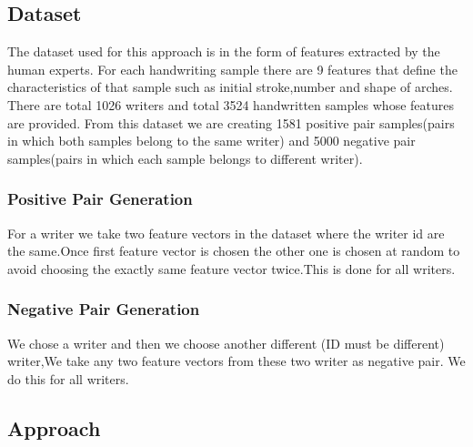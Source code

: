 \documentclass{article}
\begin{document}
\subsection{Dataset}
    The dataset used for this approach is in the form of features extracted by the human experts. For each handwriting sample there are 9 features that define the characteristics of that sample such as initial stroke,number and shape of arches. There are total 1026 writers and total 3524 handwritten samples whose features are provided. 
    From this dataset we are creating 1581 positive pair samples(pairs in which both samples belong to the same writer) and 5000 negative pair samples(pairs in which each sample belongs to different writer).
    \subsubsection{Positive Pair Generation}
        For a writer we take two feature vectors in the dataset where the writer id are the same.Once first feature vector is chosen the other one is chosen at random to avoid choosing the exactly same feature vector twice.This is done for all writers.
    \subsubsection{Negative Pair Generation}
        We chose a writer and then we choose another different (ID must be different) writer,We take any two feature vectors from these two writer as negative pair. We do this for all writers.
\subsection{Approach}
\end{document}
